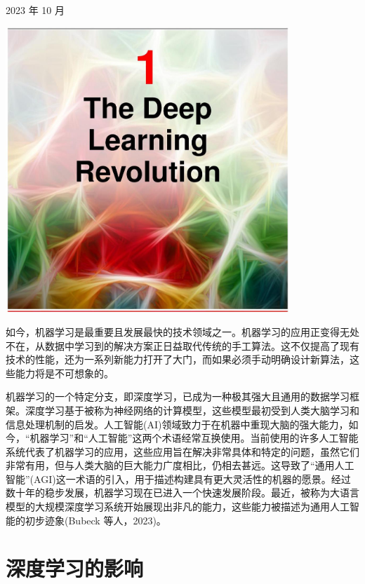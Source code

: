 \documentclass[10pt]{article}
\begin{document}
2023 年 10 月


\begin{center}
\includegraphics[max width=0.8\textwidth]{images/0194e279-9b28-703a-88f4-c3ac21e2010d_20_474_353_1074_1083_0.jpg}
\end{center}
\hspace*{3em} 

如今，机器学习是最重要且发展最快的技术领域之一。机器学习的应用正变得无处不在，从数据中学习到的解决方案正日益取代传统的手工算法。这不仅提高了现有技术的性能，还为一系列新能力打开了大门，而如果必须手动明确设计新算法，这些能力将是不可想象的。

机器学习的一个特定分支，即深度学习，已成为一种极其强大且通用的数据学习框架。深度学习基于被称为神经网络的计算模型，这些模型最初受到人类大脑学习和信息处理机制的启发。人工智能(AI)领域致力于在机器中重现大脑的强大能力，如今，“机器学习”和“人工智能”这两个术语经常互换使用。当前使用的许多人工智能系统代表了机器学习的应用，这些应用旨在解决非常具体和特定的问题，虽然它们非常有用，但与人类大脑的巨大能力广度相比，仍相去甚远。这导致了“通用人工智能”(AGI)这一术语的引入，用于描述构建具有更大灵活性的机器的愿景。经过数十年的稳步发展，机器学习现在已进入一个快速发展阶段。最近，被称为大语言模型的大规模深度学习系统开始展现出非凡的能力，这些能力被描述为通用人工智能的初步迹象(Bubeck 等人，2023)。


\section{深度学习的影响}
\end{document}
